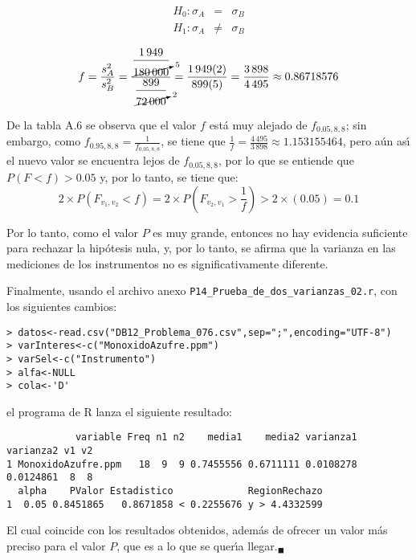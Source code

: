 \begin{solucion}
 \begin{hipotesis}
  \begin{eqnarray*}
   H_0: \sigma_A &  =   & \sigma_B \\
   H_1: \sigma_A & \neq & \sigma_B
  \end{eqnarray*}
 \end{hipotesis}

 \begin{estadistico}
  \begin{equation*}
   f = \frac{s_A^2}{s_B^2}
   = \frac{\displaystyle{\frac{1\,949}{\cancelto{5}{180\,000}}}}
   {\displaystyle{\frac{899}{\cancelto{2}{72\,000}}}}
   = \frac{1\,949(2)}{899(5)}
   = \frac{3\,898}{4\,495} \approx 0.86718576
  \end{equation*}
 \end{estadistico}

 \begin{valorp}
  De la tabla A.6 se observa que el valor $f$
  est\'a muy alejado de $f_{0.05,8,8}$;
  sin embargo, como $f_{0.95,8,8} = \frac{1}{f_{0.05,8,8}}$,
  se tiene que $\frac{1}{f} = \frac{4\,495}{3\,898} \approx 1.153155464$,
  pero a\'un as\'{\i} el nuevo valor se encuentra lejos de $f_{0.05,8,8}$,
  por lo que se entiende que $P(F<f) > 0.05$ y, por lo tanto, 
  se tiene que:
  \begin{equation*}
   2\times P\left( F_{v_1,v_2} < f \right)
   = 2\times P\left( F_{v_2,v_1} > \frac{1}{f} \right) > 2\times(0.05) = 0.1
  \end{equation*}
 \end{valorp}

 \begin{conclusion}
  Por lo tanto, como el valor $P$ es muy grande,
  entonces no hay evidencia suficiente para rechazar la hip\'otesis nula,
  y, por lo tanto, se afirma que la varianza en las mediciones
  de los instrumentos no es significativamente diferente.
 \end{conclusion}

 Finalmente, usando el archivo anexo \texttt{P14\_Prueba\_de\_dos\_varianzas\_02.r}, con los siguientes cambios:
 \begin{verbatim}
> datos<-read.csv("DB12_Problema_076.csv",sep=";",encoding="UTF-8")
> varInteres<-c("MonoxidoAzufre.ppm")
> varSel<-c("Instrumento")
> alfa<-NULL
> cola<-'D'
 \end{verbatim}
 \vspace{-0.5cm}
 el programa de R lanza el siguiente resultado:
 \begin{verbatim}
            variable Freq n1 n2    media1    media2 varianza1 varianza2 v1 v2
1 MonoxidoAzufre.ppm   18  9  9 0.7455556 0.6711111 0.0108278 0.0124861  8  8
  alpha    PValor Estadistico             RegionRechazo
1  0.05 0.8451865   0.8671858 < 0.2255676 y > 4.4332599
 \end{verbatim}
 \vspace{-0.5cm}
 El cual coincide con los resultados obtenidos,
 adem\'as de ofrecer un valor m\'as preciso para el valor $P$,
 que es a lo que se quer\'{\i}a llegar.${}_{\blacksquare}$
\end{solucion}

